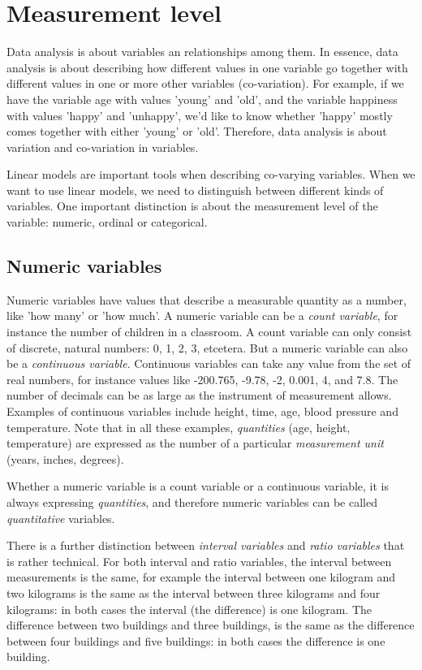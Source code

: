 \documentclass[]{book}\usepackage[]{graphicx}\usepackage[]{color}
\begin{document}
\section{Measurement level}


Data analysis is about variables an relationships among them. In essence, data analysis is about describing how different values in one variable go together with different values in one or more other variables (co-variation). For example, if we have the variable age with values 'young' and 'old', and the variable happiness with values 'happy' and 'unhappy', we'd like to know whether 'happy' mostly comes together with either 'young' or 'old'. Therefore, data analysis is about variation and co-variation in variables.

Linear models are important tools when describing co-varying variables. When we want to use linear models, we need to distinguish between different kinds of variables. One important distinction is about the measurement level of the variable: numeric, ordinal or categorical.


\subsection{Numeric variables}

Numeric variables have values that describe a measurable quantity as a number, like 'how many' or 'how much'. A numeric variable can be a \textit{count variable}, for instance the number of children in a classroom. A count variable can only consist of discrete, natural numbers: 0, 1, 2, 3, etcetera. But a numeric variable can also be a \textit{continuous variable}. Continuous variables can take any value from the set of real numbers, for instance values like -200.765, -9.78, -2, 0.001, 4, and 7.8. The number of decimals can be as large as the instrument of measurement allows. Examples of continuous variables include height, time, age, blood pressure and temperature. Note that in all these examples, \textit{quantities} (age, height, temperature) are expressed as the number of a particular \textit{measurement unit} (years, inches, degrees).

Whether a numeric variable is a count variable or a continuous variable, it is always expressing \textit{quantities}, and therefore numeric variables can be called \textit{quantitative} variables.

There is a further distinction between \textit{interval variables} and \textit{ratio variables} that is rather technical. For both interval and ratio variables, the interval between measurements is the same, for example the interval between one kilogram and two kilograms is the same as the interval between three kilograms and four kilograms: in both cases the interval (the difference) is one kilogram. The difference between two buildings and three buildings, is the same as the difference between four buildings and five buildings: in both cases the difference is one building.
\end{document}
